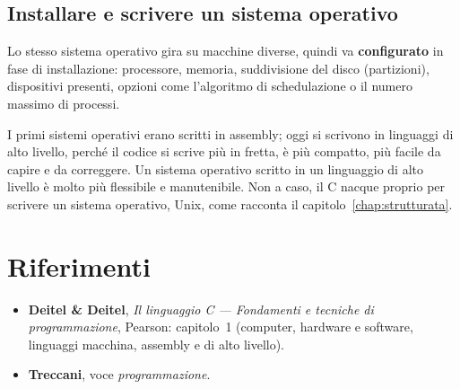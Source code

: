 \subsection{Installare e scrivere un sistema operativo}

Lo stesso sistema operativo gira su macchine diverse, quindi va
\textbf{configurato} in fase di installazione: processore, memoria,
suddivisione del disco (partizioni), dispositivi presenti, opzioni come
l'algoritmo di schedulazione o il numero massimo di processi.

I primi sistemi operativi erano scritti in assembly; oggi si scrivono in
linguaggi di alto livello, perché il codice si scrive più in fretta, è più
compatto, più facile da capire e da correggere. Un sistema operativo scritto
in un linguaggio di alto livello è molto più flessibile e manutenibile. Non
a caso, il C nacque proprio per scrivere un sistema operativo, Unix, come
racconta il capitolo~\ref{chap:strutturata}.


\section{Riferimenti}

\begin{itemize}
  \item \textbf{Deitel \& Deitel}, \textit{Il linguaggio C --- Fondamenti e
        tecniche di programmazione}, Pearson: capitolo~1 (computer,
        hardware e software, linguaggi macchina, assembly e di alto
        livello).
  \item \textbf{Treccani}, voce \textit{programmazione}. \\
\end{itemize}
